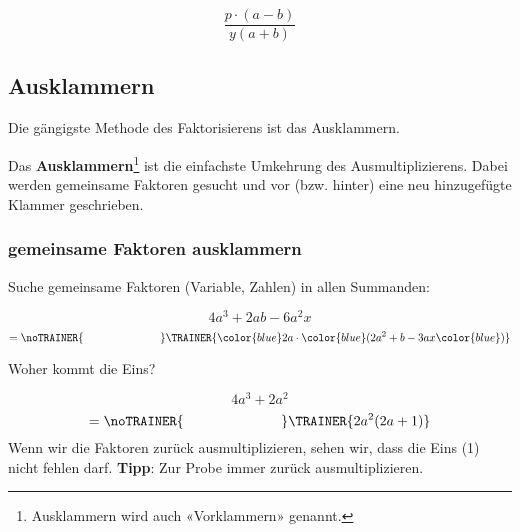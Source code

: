 $$\frac{p\cdot{}(a-b)}{y(a+b)}$$

\newpage

\subsection{Ausklammern}
Die gängigste Methode des Faktorisierens ist das Ausklammern.

Das \textbf{Ausklammern}\footnote{Ausklammern wird auch «Vorklammern» genannt.} ist die einfachste Umkehrung des Ausmultiplizierens.
Dabei werden gemeinsame Faktoren gesucht und vor (bzw. hinter) eine
neu hinzugefügte Klammer geschrieben.

\subsubsection{gemeinsame Faktoren ausklammern}
Suche gemeinsame Faktoren (Variable, Zahlen) in allen Summanden:

\begin{beispiel}{}{}
  $$4a^3 + 2ab -6a^2x$$
  $$=\noTRAINER{\hspace{7em}}\TRAINER{ {\color{blue}2a}\cdot{}{\color{blue}(}2a^2+b -3ax{\color{blue})}}$$
\end{beispiel}

\begin{beispiel}{Woher kommt die Eins?}{}

$$4a^3 + 2a^2$$
$$=\noTRAINER{\hspace{7em}}\TRAINER{2a^2(2a + 1)}$$
Wenn wir die Faktoren zurück ausmultiplizieren, sehen wir, dass die
Eins (1) nicht fehlen darf. \textbf{Tipp}: Zur Probe immer zurück ausmultiplizieren.
\end{beispiel}




\newcommand{\olatAB}[2]{\subsection*{Aufgaben}
\aufgabenFarbe{OLAT #1. Aufg. #2}
\platzFuerBerechnungenBisEndeSeite{}}



